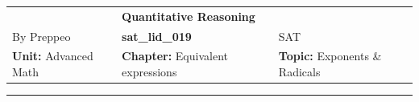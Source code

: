 \documentclass[11pt,paper=a4,answers]{exam}
\begin{document}
\begin{center}
    \centering
    \renewcommand{\arraystretch}{1.5}
    \begin{tabularx}{\textwidth}{YYY}
    & \normalsize\bf{{\Large{{Quantitative Reasoning}}}} & \\
    By Preppeo & \normalsize\bf{{sat\_lid\_019}} & SAT\\
    \normalsize{{\textbf{{Unit:}} Advanced Math}} & \normalsize{{\textbf{{Chapter:}} Equivalent expressions}} & \normalsize{{\textbf{{Topic:}} Exponents \& Radicals}} \\
    \end{tabularx}
\end{center}
\par\noindent\rule{\textwidth}{1pt}
\end{document}
